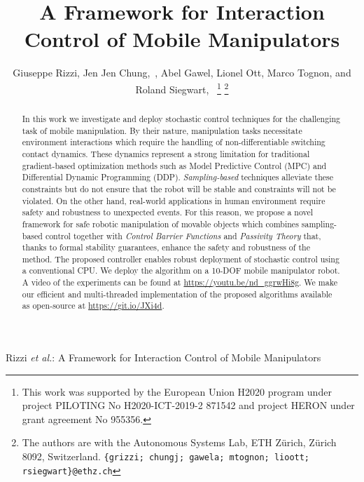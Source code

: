 \documentclass[journal]{IEEEtran}  %
\begin{document}
\title{
A Framework for Interaction Control of Mobile Manipulators
}


\author{Giuseppe Rizzi, Jen Jen Chung,~, Abel Gawel, Lionel Ott, Marco Tognon, and Roland Siegwart,~%
\thanks{This work was supported by the European Union H2020 program under project PILOTING No H2020-ICT-2019-2 871542 and project HERON under grant agreement No 955356.}
\thanks{The authors are with the Autonomous Systems Lab, ETH Z\"urich, Z\"urich 8092, Switzerland. {\tt\small\{grizzi; chungj; gawela; mtognon; lioott; rsiegwart\}@ethz.ch}}%
}

%                              
{Rizzi \MakeLowercase{\textit{et al.}}: A Framework for Interaction Control of Mobile Manipulators}




\maketitle


\begin{abstract}

In this work we investigate and deploy stochastic control techniques for the challenging task of mobile manipulation. By their nature, manipulation tasks necessitate environment interactions which require the handling of non-differentiable switching contact dynamics. These dynamics represent a strong limitation for traditional gradient-based optimization methods such as Model Predictive Control (MPC) and Differential Dynamic Programming (DDP). \emph{Sampling-based} techniques alleviate these constraints but do not ensure that the robot will be stable and constraints will not be violated. On the other hand, real-world applications in human environment require safety and robustness to unexpected events. For this reason, we propose a novel framework for safe robotic manipulation of movable objects which combines sampling-based control together with \emph{Control Barrier Functions} and \emph{Passivity Theory} that, thanks to formal stability guarantees, enhance the safety and robustness of the method. The proposed controller enables robust deployment of stochastic control using a conventional CPU. We deploy the algorithm on a 10-DOF mobile manipulator robot. A video of the experiments can be found at \url{https://youtu.be/nd_ggrwHi8g}. We make our efficient and multi-threaded implementation of the proposed algorithms available as open-source at \url{https://git.io/JXi4d}.
\end{abstract}
\end{document}
